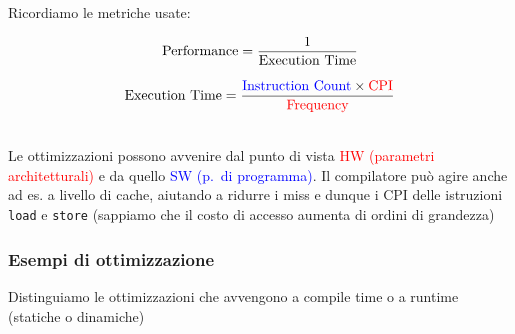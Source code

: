 Ricordiamo le metriche usate:

\noindent\begin{minipage}[c]{.5\textwidth}
  \begin{equation*}
    \text{Performance} = {{1}\over\text{Execution Time}}
  \end{equation*}
\end{minipage}
\begin{minipage}[c]{.5\textwidth}
  \begin{equation*}
    \text{Execution Time} = {\textcolor{blue}{\text{Instruction Count}} \times \textcolor{red}{\text{CPI}} \over \textcolor{red}{\text{Frequency}}}
  \end{equation*}
\end{minipage}\\

Le ottimizzazioni possono avvenire dal punto di vista \textcolor{red}{HW (parametri architetturali)} e da quello \textcolor{blue}{SW (p.~di programma)}. Il compilatore pu\`o agire anche ad es. a livello di cache, aiutando a ridurre i miss e dunque i CPI delle istruzioni \lstinline|load| e \lstinline|store| (sappiamo che il costo di accesso aumenta di ordini di grandezza)

\subsubsection{Esempi di ottimizzazione}

\begin{emphasize}
  Distinguiamo le ottimizzazioni che avvengono a compile time o a runtime (statiche o dinamiche)
\end{emphasize}

